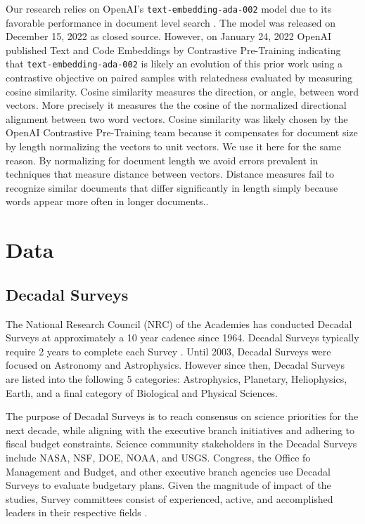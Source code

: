 \documentclass[preprint,12pt,doubleblind]{elsarticle}
\begin{document}
Our research relies on OpenAI's \texttt{text-embedding-ada-002} model due to its favorable performance in document level search \cite{Aperdannier2024_embedding_search}. The model was released on December 15, 2022 \cite{openai2023ada_embeddings} as closed source. However, on January 24, 2022 OpenAI published Text and Code Embeddings by Contrastive Pre-Training \cite{neelakantan2022openAi_embeddings} indicating that \texttt{text-embedding-ada-002} is likely an evolution of this prior work using a contrastive objective on paired samples with relatedness evaluated by measuring cosine similarity.  Cosine similarity measures the direction, or angle, between word vectors.  More precisely it measures the the cosine of the normalized directional alignment between two word vectors. Cosine similarity was likely chosen by the OpenAI Contrastive Pre-Training team because it compensates for document size by length normalizing the vectors to unit vectors. We use it here for the same reason. By normalizing for document length we avoid errors prevalent in techniques that measure distance between vectors. Distance measures fail to recognize similar documents that differ significantly in length simply because words appear more often in longer documents.\cite{manning2008_introduction_ir}.

\section{Data}
\label{data}
\subsection{Decadal Surveys}
The National Research Council (NRC) of the Academies has conducted Decadal Surveys at approximately a 10 year cadence since 1964. Decadal Surveys typically require 2 years to complete each Survey \cite{Academies2015_lessons}. Until 2003, Decadal Surveys were focused on Astronomy and Astrophysics. However since then, Decadal Surveys are listed into the following 5 categories: Astrophysics, Planetary, Heliophysics, Earth, and a final category of Biological and Physical Sciences.

The purpose of Decadal Surveys is to reach consensus on science priorities for the next decade, while aligning with the executive branch initiatives and adhering to fiscal budget constraints. Science community stakeholders in the Decadal Surveys include NASA, NSF, DOE, NOAA, and USGS. Congress, the Office fo Management and Budget, and other executive branch agencies use Decadal Surveys to evaluate budgetary plans. Given the magnitude of impact of the studies, Survey committees consist of experienced, active, and accomplished leaders in their respective fields \cite{Academies2015_lessons}.
\end{document}

